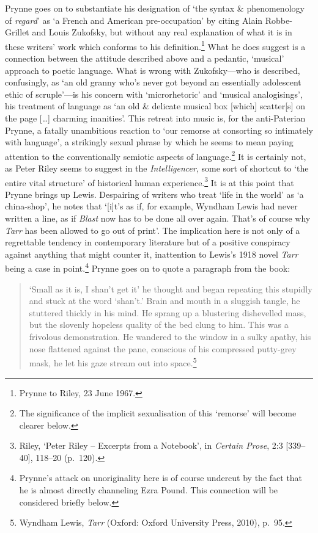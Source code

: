 \documentclass[]{article}
\begin{document}
Prynne goes on to substantiate his designation of `the syntax \&
phenomenology of \emph{regard}' as `a French and American
pre-occupation' by citing Alain Robbe-Grillet and Louis Zukofsky, but
without any real explanation of what it is in these writers' work which
conforms to his definition.\footnote{Prynne to Riley, 23 June 1967.}
What he does suggest is a connection between the attitude described
above and a pedantic, `musical' approach to poetic language. What is
wrong with Zukofsky---who is described, confusingly, as `an old granny
who's never got beyond an essentially adolescent ethic of scruple'---is
his concern with `microrhetoric' and `musical analogisings', his
treatment of language as `an old \& delicate musical box {[}which{]}
scatter{[}s{]} on the page {[}\ldots{}{]} charming inanities'. This
retreat into music is, for the anti-Paterian Prynne, a fatally
unambitious reaction to `our remorse at consorting so intimately with
language', a strikingly sexual phrase by which he seems to mean paying
attention to the conventionally semiotic aspects of language.\footnote{The
  significance of the implicit sexualisation of this `remorse' will
  become clearer below.} It is certainly not, as Peter Riley seems to
suggest in the \emph{Intelligencer}, some sort of shortcut to `the
entire vital structure' of historical human experience.\footnote{Riley,
  `Peter Riley -- Excerpts from a Notebook', in \emph{Certain Prose},
  2:3 {[}339--40{]}, 118--20 (p.~120).} It is at this point that Prynne
brings up Lewis. Despairing of writers who treat `life in the world' as
`a china-shop', he notes that `{[}i{]}t's as if, for example, Wyndham
Lewis had never written a line, as if \emph{Blast} now has to be done
all over again. That's of course why \emph{Tarr} has been allowed to go
out of print'. The implication here is not only of a regrettable
tendency in contemporary literature but of a positive conspiracy against
anything that might counter it, inattention to Lewis's 1918 novel
\emph{Tarr} being a case in point.\footnote{Prynne's attack on
  unoriginality here is of course undercut by the fact that he is almost
  directly channeling Ezra Pound. This connection will be considered
  briefly below.} Prynne goes on to quote a paragraph from the book:

\begin{quote}
`Small as it is, I shan't get it' he thought and began repeating this
stupidly and stuck at the word `shan't.' Brain and mouth in a sluggish
tangle, he stuttered thickly in his mind. He sprang up a blustering
dishevelled mass, but the slovenly hopeless quality of the bed clung to
him. This was a frivolous demonstration. He wandered to the window in a
sulky apathy, his nose flattened against the pane, conscious of his
compressed putty-grey mask, he let his gaze stream out into
space.\footnote{Wyndham Lewis, \emph{Tarr} (Oxford: Oxford University
  Press, 2010), p.~95.}
\end{quote}
\end{document}
